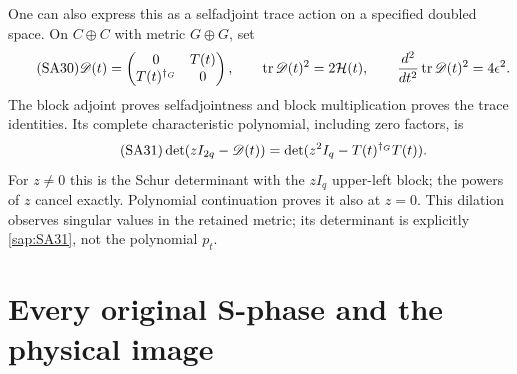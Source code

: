 \documentclass[11pt]{article}
\begin{document}
One can also express this as a selfadjoint trace action
on a specified doubled space. On $C\oplus C$ with metric
$G\oplus G$, set
\begin{equation}\tag{SA30}\label{sap:SA30}
\mathscr D(t)=
\begin{pmatrix}0&T(t)\\T(t)^{\dagger_G}&0\end{pmatrix},
\qquad
\operatorname{tr}\mathscr D(t)^2=2\mathcal H(t),\qquad
\frac{d^2}{dt^2}\operatorname{tr}\mathscr D(t)^2=4\epsilon^2 .
\end{equation}
The block adjoint proves selfadjointness and block
multiplication proves the trace identities. Its complete
characteristic polynomial, including zero factors, is
\begin{equation}\tag{SA31}\label{sap:SA31}
\det(zI_{2q}-\mathscr D(t))
=\det(z^2I_q-T(t)^{\dagger_G}T(t)).
\end{equation}
For $z\ne0$ this is the Schur determinant with the
$zI_q$ upper-left block; the powers of $z$ cancel
exactly. Polynomial continuation proves it also at
$z=0$. This dilation observes singular values in the
retained metric; its determinant is explicitly
\eqref{sap:SA31}, not the polynomial $p_t$.

\section{Every original S-phase and the physical image}
\end{document}
